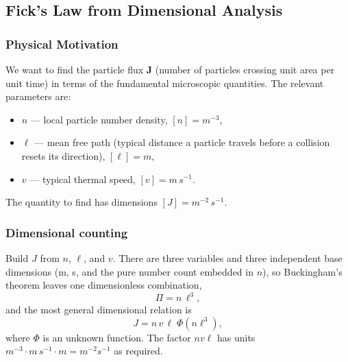 \subsection{Fick's Law from Dimensional Analysis}
\label{sec:lec06:fick-derivation}

\subsubsection*{Physical Motivation}
We want to find the particle flux $\mathbf{J}$ (number of particles crossing
unit area per unit time) in terms of the fundamental microscopic quantities.
The relevant parameters are:
\begin{itemize}
    \item $n$ — local particle number density, $[n] = \si{m^{-3}}$,
    \item $\ell$ — mean free path (typical distance a particle travels
          before a collision resets its direction), $[\ell] = \si{m}$,
    \item $v$ — typical thermal speed, $[v] = \si{m\,s^{-1}}$.
\end{itemize}
The quantity to find has dimensions $[J] = \si{m^{-2}\,s^{-1}}$.

\subsubsection*{Dimensional counting}
Build $J$ from $n$, $\ell$, and $v$. There are three variables and three
independent base dimensions (m, s, and the pure number count embedded in $n$),
so Buckingham's theorem leaves one dimensionless combination,
\begin{equation}
    \Pi = n\,\ell^3 ,
    \label{eq:lec06:pi-group-diffusion}
\end{equation}
and the most general dimensional relation is
\begin{equation}
    J = n\,v\,\ell\;\Phi\!\left(n\ell^3\right) ,
    \label{eq:lec06:J-general}
\end{equation}
where $\Phi$ is an unknown function. The factor $nv\ell$ has units
$\si{m^{-3}}\cdot\si{m\,s^{-1}}\cdot\si{m} = \si{m^{-2}s^{-1}}$ as required.

